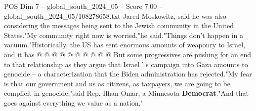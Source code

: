 \begin{textsample}{POS Dim 7 – global\_south\_2024\_05 – Score 7.00 – global\_south\_2024\_05/108278658.txt}
Jared Moskowitz, said he was also considering the messages being sent to the Jewish community in the United States."My community right now is worried,"he said."Things don't happen in a vacuum."Historically, the US has sent enormous amounts of weaponry to Israel, and it has @ @ @ @ @ @ @ @ @ @ But some progressives are pushing for an end to that relationship as they argue that Israel ' s campaign into Gaza amounts to genocide -- a characterization that the Biden administration has rejected."My fear is that our government and us as citizens, as taxpayers, we are going to be complicit in genocide,"said Rep.
Ilhan Omar, a Minnesota \textbf{Democrat}."And that goes against everything we value as a nation."

\end{textsample}
